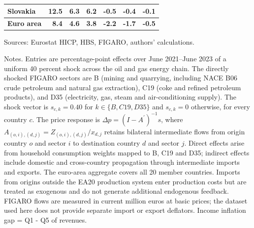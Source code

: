 \begin{table}[H]
\begin{tabular}{lrrrrrr}
 \\
Slovakia & 12.5 & 6.3 & 6.2 & -0.5 & -0.4 & -0.1
 \\
\midrule
\textbf{Euro area} & \textbf{8.4} & \textbf{4.6} & \textbf{3.8} & \textbf{-2.2} & \textbf{-1.7} & \textbf{-0.5}
 \\
\bottomrule
\end{tabular}
\par\vspace{0.35em}\footnotesize\noindent Sources: Eurostat HICP, HBS, FIGARO, authors' calculations.
\par\vspace{0.25em}\footnotesize\noindent Notes. Entries are percentage-point effects over June 2021--June 2023 of a uniform 40 percent shock across the oil and gas energy chain. The directly shocked FIGARO sectors are B (mining and quarrying, including NACE B06 crude petroleum and natural gas extraction), C19 (coke and refined petroleum products), and D35 (electricity, gas, steam and air-conditioning supply). The shock vector is $s_{c,k}=0.40$ for $k\in\{B,C19,D35\}$ and $s_{c,k}=0$ otherwise, for every country $c$. The price response is $\Delta p = (I - A^{\prime})^{-1}s$, where $A_{(o,i),(d,j)}=Z_{(o,i),(d,j)}/x_{d,j}$ retains bilateral intermediate flows from origin country $o$ and sector $i$ to destination country $d$ and sector $j$. Direct effects arise from household consumption weights mapped to B, C19 and D35; indirect effects include domestic and cross-country propagation through intermediate imports and exports. The euro-area aggregate covers all 20 member countries. Imports from origins outside the EA20 production system enter production costs but are treated as exogenous and do not generate additional endogenous feedback. FIGARO flows are measured in current million euros at basic prices; the dataset used here does not provide separate import or export deflators. Income inflation gap = Q1 - Q5 of revenues.
\end{table}
\vspace{0.6em}
